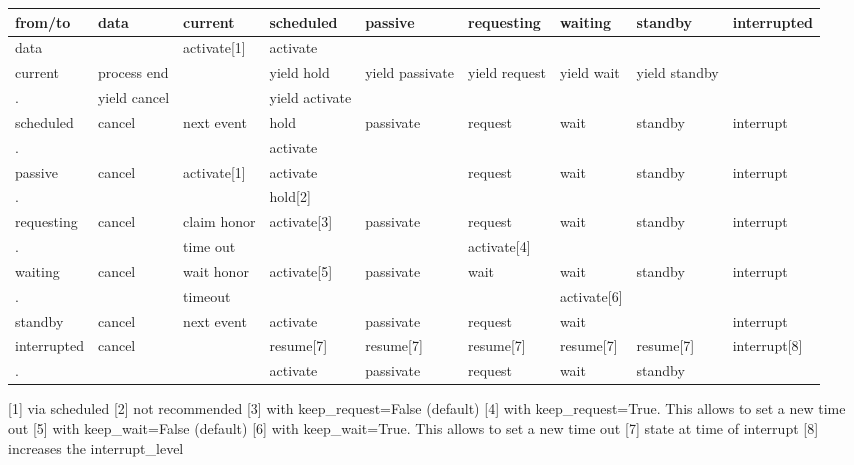 \documentclass[letterpaper,10pt,english]{sphinxmanual}
\begin{document}
\begin{savenotes}\sphinxattablestart
\centering
\begin{tabulary}{\linewidth}[t]{|T|T|T|T|T|T|T|T|T|}
\hline
\sphinxstyletheadfamily 
from/to
&\sphinxstyletheadfamily 
data
&\sphinxstyletheadfamily 
current
&\sphinxstyletheadfamily 
scheduled
&\sphinxstyletheadfamily 
passive
&\sphinxstyletheadfamily 
requesting
&\sphinxstyletheadfamily 
waiting
&\sphinxstyletheadfamily 
standby
&\sphinxstyletheadfamily 
interrupted
\\
\hline
data
&&
activate{[}1{]}
&
activate
&&&&&\\
\hline
current
&
process end
&&
yield hold
&
yield passivate
&
yield request
&
yield wait
&
yield standby
&\\
\hline
.
&
yield cancel
&&
yield activate
&&&&&\\
\hline
scheduled
&
cancel
&
next event
&
hold
&
passivate
&
request
&
wait
&
standby
&
interrupt
\\
\hline
.
&&&
activate
&&&&&\\
\hline
passive
&
cancel
&
activate{[}1{]}
&
activate
&&
request
&
wait
&
standby
&
interrupt
\\
\hline
.
&&&
hold{[}2{]}
&&&&&\\
\hline
requesting
&
cancel
&
claim honor
&
activate{[}3{]}
&
passivate
&
request
&
wait
&
standby
&
interrupt
\\
\hline
.
&&
time out
&&&
activate{[}4{]}
&&&\\
\hline
waiting
&
cancel
&
wait honor
&
activate{[}5{]}
&
passivate
&
wait
&
wait
&
standby
&
interrupt
\\
\hline
.
&&
timeout
&&&&
activate{[}6{]}
&&\\
\hline
standby
&
cancel
&
next event
&
activate
&
passivate
&
request
&
wait
&&
interrupt
\\
\hline
interrupted
&
cancel
&&
resume{[}7{]}
&
resume{[}7{]}
&
resume{[}7{]}
&
resume{[}7{]}
&
resume{[}7{]}
&
interrupt{[}8{]}
\\
\hline
.
&&&
activate
&
passivate
&
request
&
wait
&
standby
&\\
\hline
\end{tabulary}
\par
\sphinxattableend\end{savenotes}

{[}1{]} via scheduled 
{[}2{]} not recommended 
{[}3{]} with keep\_request=False (default) 
{[}4{]} with keep\_request=True. This allows to set a new time out 
{[}5{]} with keep\_wait=False (default) 
{[}6{]} with keep\_wait=True. This allows to set a new time out 
{[}7{]} state at time of interrupt 
{[}8{]} increases the interrupt\_level 
\end{document}
